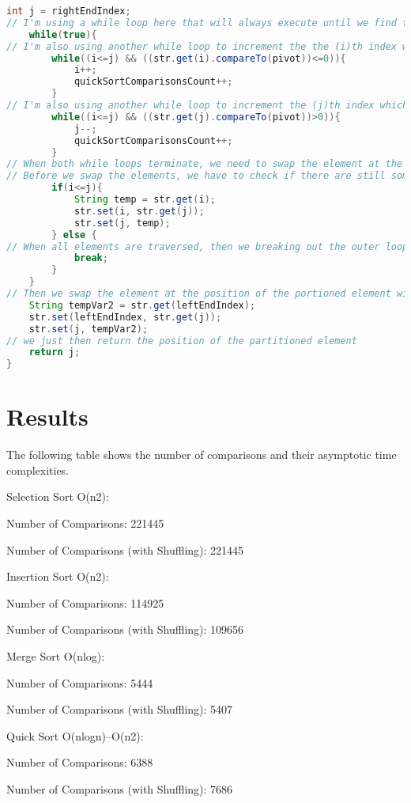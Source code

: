 \documentclass{article}
\begin{document}
\begin{lstlisting}[language=Java]
    int j = rightEndIndex;
// I'm using a while loop here that will always execute until we find the position of the partitioned element. Then we will break out the loop once we find that.
    while(true){
// I'm also using another while loop to increment the the (i)th index which is on the left sub-list and will compare its values with the pivot. This loop will terminate if the value at the (i)th index is greater than pivot. 
        while((i<=j) && ((str.get(i).compareTo(pivot))<=0)){
            i++;
            quickSortComparisonsCount++;
        }
// I'm also using another while loop to increment the (j)th index which is on the right sub-list and will compare its values with the pivot. This loop will terminate if the value at the (j)th index is less than pivot. Because, we want to keep all the value greater than the pivot on the right as well as keeping the ones less than the pivot on the left side.
        while((i<=j) && ((str.get(j).compareTo(pivot))>0)){
            j--;
            quickSortComparisonsCount++;
        }
// When both while loops terminate, we need to swap the element at the (i)th index with the one at (j)th index since they didn't satisfy the conditions in the above two while loops. 
// Before we swap the elements, we have to check if there are still some elements that we didn't visit using this condition in the following if statement (i<=j) 
        if(i<=j){
            String temp = str.get(i);
            str.set(i, str.get(j));
            str.set(j, temp);
        } else {
// When all elements are traversed, then we breaking out the outer loop, which also means that we have found the position of the portioning element 
            break;
        }
    }
// Then we swap the element at the position of the portioned element with the first element in the ArrayList which we chose as our pivot. 
    String tempVar2 = str.get(leftEndIndex);
    str.set(leftEndIndex, str.get(j));
    str.set(j, tempVar2);
// we just then return the position of the partitioned element
    return j;  
}
\end{lstlisting}
\clearpage
\section{Results}
The following table shows the number of comparisons and their asymptotic time complexities. 

Selection Sort O(n2): 

Number of Comparisons: 221445

Number of Comparisons (with Shuffling): 221445

Insertion Sort O(n2): 

Number of Comparisons: 114925

Number of Comparisons (with Shuffling): 109656

Merge Sort O(nlog): 

Number of Comparisons: 5444

Number of Comparisons (with Shuffling): 5407

Quick Sort O(nlogn)--O(n2): 

Number of Comparisons: 6388

Number of Comparisons (with Shuffling): 7686
\end{document}
